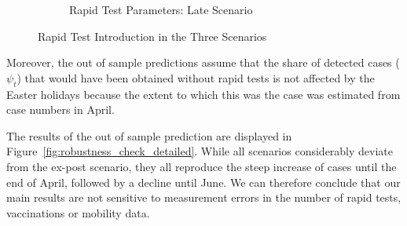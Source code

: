 \begin{figure}[ht]
\begin{subfigure}[b]{0.3\textwidth}
        \caption{Rapid Test Parameters: Late Scenario}
        \label{fig:robustness_late_params}
    \end{subfigure}

    \caption{Rapid Test Introduction in the Three Scenarios}
    \label{fig:robustness_check_rapid_test_params}

\end{figure}

Moreover, the out of sample predictions assume that the share of detected cases
($\psi_t$) that would have been obtained without rapid tests is not affected by the
Easter holidays because the extent to which this was the case was estimated from case
numbers in April.

The results of the out of sample prediction are displayed in
Figure~\ref{fig:robustness_check_detailed}. While all scenarios considerably deviate
from the ex-post scenario, they all reproduce the steep increase of cases until the end
of April, followed by a decline until June. We can therefore conclude that our main
results are not sensitive to measurement errors in the number of rapid tests,
vaccinations or mobility data.


